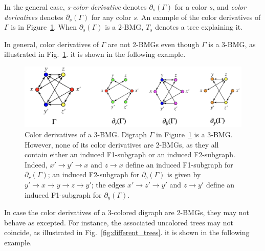 \documentclass[final,3p,times]{elsarticle}
\newtheorem{example}{Example}[section]
\newcommand{\OLD}[1]{\begingroup\tiny\color{gray}#1\endgroup}
\newcommand{\mh}[1]{\begingroup\color{magenta}#1\endgroup}
\begin{document}
In the general case, \emph{s-color derivative} denotes $\partial_s(\Gamma)$ for a color $s$, and \emph{color derivatives} denotes $\partial_s(\Gamma)$ for any color $s$. An example of the color derivatives of $\Gamma$ is in Figure~\ref{fig:color_derivatives}. When $\partial_s(\Gamma)$ is a 2-BMG, $T_s$ denotes a tree explaining it.

In general, color derivatives of $\Gamma$ are not 2-BMGs even though $\Gamma$ is a 3-BMG, as \mh{illustrated in Fig.\ \ref{fig:color_derivatives}.}
\OLD{it is shown in the following example.}

\begin{figure}[ht]
  \centering
    \includegraphics[width=16cm]{figures/color_derivatives.png}
    \caption{Color derivatives of a 3-BMG.
    Digraph $\Gamma$ in Figure~\ref{fig:color_derivatives} is a 3-BMG. However,
    none of its color derivatives are 2-BMGs, as they all contain either an
    induced F1-subgraph or an induced F2-subgraph. Indeed, $x'\rightarrow
    y'\rightarrow x$ and $z\rightarrow x$ define an induced F1-subgraph for
    $\partial_r(\Gamma)$; an induced F2-subgraph for $\partial_b(\Gamma)$ is
    given by $y'\rightarrow x\rightarrow y\rightarrow z\rightarrow y'$; the
    edges $x'\rightarrow z'\rightarrow y'$ and $z \rightarrow y'$ define an
    induced F1-subgraph for $\partial_y(\Gamma)$.
}
      \label{fig:color_derivatives}
\end{figure}


In case the color derivatives of a 3-colored digraph are 2-BMGs, they may not behave as excepted. For instance, the associated uncolored trees may not coincide, as 
\mh{illustrated in Fig.\ \ref{fig:different_trees}.}
\OLD{it is shown in the following example. }
\end{document}
